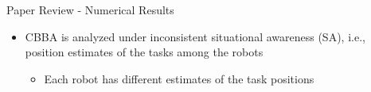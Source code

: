 \begin{frame}{Paper Review - Numerical Results}
    \begin{itemize}
        \item CBBA is analyzed under inconsistent situational awareness (SA), i.e., position estimates of the tasks among the robots
        \begin{itemize}
            \item Each robot has different estimates of the task positions
        \end{itemize}
    \end{itemize}
    \begin{figure}
        \centering
        \hfill
    \label{fig:2}
    \end{figure}
\end{frame}

